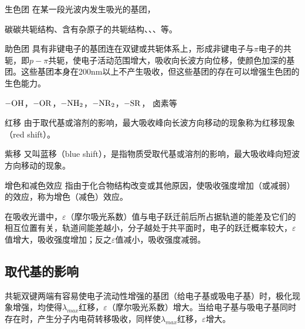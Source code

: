 \begin{definition*}{生色团}
    在某一段光波内发生吸光的基团，
    \begin{example}
        碳碳共轭结构、含有杂原子的共轭结构、、、等。
    \end{example}
\end{definition*}
\begin{definition*}{助色团}
    具有非键电子的基团连在双键或共轭体系上，形成非键电子与$\pi$电子的共轭，即$p-\pi$共轭，使电子活动范围增大，吸收向长波方向位移，使颜色加深的基团。这些基团本身在200$\mathrm{nm}$以上不产生吸收，但这些基团的存在可以增强生色团的生色能力。
    \begin{example}
        $-\ce{OH}$，$-\ce{OR}$，$ -\ce{NH_{2}}$，$ -\ce{NR_{2}}$，$ -\ce{SR}$， 卤素等
    \end{example}
\end{definition*}
\begin{definition*}{红移}
    由于取代基或溶剂的影响，最大吸收峰向长波方向移动的现象称为红移现象 （red shift）。
\end{definition*}
\begin{definition*}{紫移}
    又叫蓝移（blue shift），是指物质受取代基或溶剂的影响，最大吸收峰向短波方向移动的现象。
\end{definition*}
\begin{definition*}{增色和减色效应}
    指由于化合物结构改变或其他原因，使吸收强度增加（或减弱）的效应，称为增色（减色）效应。
\end{definition*}
\begin{note}
    在吸收光谱中，$\varepsilon $（摩尔吸光系数）值与电子跃迁前后所占据轨道的能差及它们的相互位置有关，轨道间能差越小，分子越处于共平面时，电子的跃迁概率较大，$\varepsilon $值增大，吸收强度增加；反之$\varepsilon$值减小，吸收强度减弱。
\end{note}
\subsection{取代基的影响} 
共轭双键两端有容易使电子流动性增强的基团（给电子基或吸电子基）时，极化现象增强，均使得$\lambda_{max}$红移，$\varepsilon$（摩尔吸光系数）增大。当给电子基与吸电子基同时存在时，产生分子内电荷转移吸收，同样使$\lambda_{max}$红移，$\varepsilon$增大。

